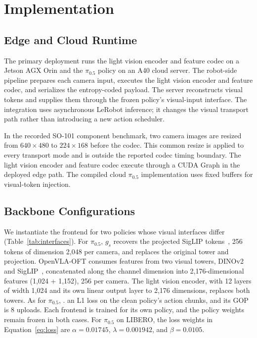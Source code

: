 \section{Implementation}
\label{sec:implementation}
\subsection{Edge and Cloud Runtime}
The primary deployment runs the light vision encoder and feature codec on
a Jetson AGX Orin and the $\pi_{0.5}$ policy on an A40 cloud server.
The robot-side pipeline prepares each camera input, executes the light
vision encoder and feature codec, and serializes the entropy-coded payload. The server
reconstructs visual tokens and supplies them through the frozen policy's
visual-input interface. The integration uses asynchronous LeRobot
inference; it changes the visual transport path rather than introducing
a new action scheduler.

In the recorded SO-101 component benchmark, two camera images are resized
from $640\times480$ to $224\times168$ before the codec. This common resize
is applied to every transport mode and is outside the reported codec
timing boundary. The light vision encoder and feature codec execute through a CUDA Graph in
the deployed edge path. The compiled cloud $\pi_{0.5}$ implementation uses
fixed buffers for visual-token injection.

\subsection{Backbone Configurations}
\label{sec:impl-backbones}
We instantiate the frontend for two policies whose visual interfaces
differ (Table~\ref{tab:interfaces}). For $\pi_{0.5}$, $g_s$ recovers the
projected SigLIP tokens~\cite{siglip}, 256 tokens of dimension 2,048 per
camera, and replaces the original tower and projection. OpenVLA-OFT
consumes features from two visual towers, DINOv2 and
SigLIP~\cite{openvla,dinov2,siglip}, concatenated along the channel
dimension into 2,176-dimensional features (1,024 + 1,152), 256 per
camera. The light vision encoder, with 12 layers of width 1,024 and its own
linear output layer to 2,176 dimensions, replaces both towers. As for
$\pi_{0.5}$, .
an L1 loss on the clean policy's action chunks, and its GOP is 8 uploads.
Each frontend is trained for its own policy, and the policy weights
remain frozen in both cases. For $\pi_{0.5}$ on LIBERO, the loss weights in
Equation~\ref{eq:loss} are $\alpha = 0.01745$, $\lambda = 0.001942$, and
$\beta = 0.0105$.

